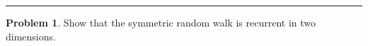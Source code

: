 \documentclass[a4paper, 10pt]{article}
\theoremstyle{definition}
\newtheorem{problem}{Problem}
\theoremstyle{hSol}
\begin{document}
\noindent\rule{16cm}{0.4pt}
\begin{problem} Show that the symmetric random walk is recurrent in two dimensions.
\end{problem}
\end{document}
